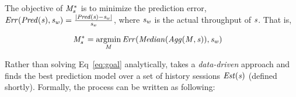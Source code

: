 The objective of $\mathit{M}^{\mathit{*}}_{\mathit{s}}$ is to minimize the prediction error, $\mathit{Err(\mathit{Pred(\mathit{s})},\mathit{\mathit{s}_{w}})}=\frac{|\mathit{Pred(\mathit{s})}-\mathit{\mathit{s}_{w}}|}{\mathit{\mathit{s}_{w}}}$, where  $\mathit{\mathit{s}_{w}}$ is the actual throughput of $\mathit{s}$. That is,


%

\begin{align}
&\mathit{M}^{\mathit{*}}_{\mathit{s}}=\operatorname*{argmin}_{\mathit{M}}
\mathit{Err(\mathit{Median}(\mathit{Agg(\mathit{M},\mathit{s})}),\mathit{\mathit{s}_{w}})} \label{eq:goal}
\end{align}

\noindent Rather than solving Eq~\ref{eq:goal} analytically, \name takes a {\em data-driven} approach and finds the best prediction model over a set of history sessions $\mathit{\mathit{Est}(\mathit{s})}$ (defined shortly). Formally, the process can be written as following:

